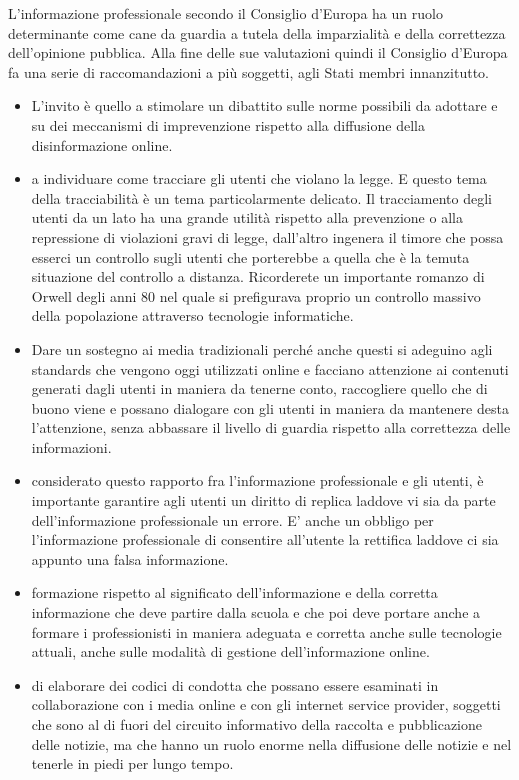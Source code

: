 L'informazione professionale secondo il Consiglio d'Europa ha un ruolo determinante come cane da guardia a tutela della imparzialità e della correttezza dell'opinione pubblica. Alla fine delle sue valutazioni quindi il Consiglio d'Europa fa una serie di raccomandazioni a più soggetti, agli Stati membri innanzitutto.

\begin{itemize}
    \item L'invito è quello a stimolare un dibattito sulle norme possibili da adottare e su dei meccanismi di imprevenzione rispetto alla diffusione della disinformazione online.
    \item a individuare come tracciare gli utenti che violano la legge. E questo tema della tracciabilità è un tema particolarmente delicato. Il tracciamento degli utenti da un lato ha una grande utilità rispetto alla prevenzione o alla repressione di violazioni gravi di legge, dall'altro ingenera il timore che possa esserci un controllo sugli utenti che porterebbe a quella che è la temuta situazione del controllo a distanza. Ricorderete un importante romanzo di Orwell degli anni 80 nel quale si prefigurava proprio un controllo massivo della popolazione attraverso tecnologie informatiche.
    \item Dare un sostegno ai media tradizionali perché anche questi si adeguino agli standards che vengono oggi utilizzati online e facciano attenzione ai contenuti generati dagli utenti in maniera da tenerne conto, raccogliere quello che di buono viene e possano dialogare con gli utenti in maniera da mantenere desta l'attenzione, senza abbassare il livello di guardia rispetto alla correttezza delle informazioni.
    \item considerato questo rapporto fra l'informazione professionale e gli utenti, è importante garantire agli utenti un diritto di replica laddove vi sia da parte dell'informazione professionale un errore. E' anche un obbligo per l'informazione professionale di consentire all'utente la rettifica laddove ci sia appunto una falsa informazione.
    \item formazione rispetto al significato dell'informazione e della corretta informazione che deve partire dalla scuola e che poi deve portare anche a formare i professionisti in maniera adeguata e corretta anche sulle tecnologie attuali, anche sulle modalità di gestione dell'informazione online.
    \item di elaborare dei codici di condotta che possano essere esaminati in collaborazione con i media online e con gli internet service provider, soggetti che sono al di fuori del circuito informativo della raccolta e pubblicazione delle notizie, ma che hanno un ruolo enorme nella diffusione delle notizie e nel tenerle in piedi per lungo tempo.

\end{itemize}
